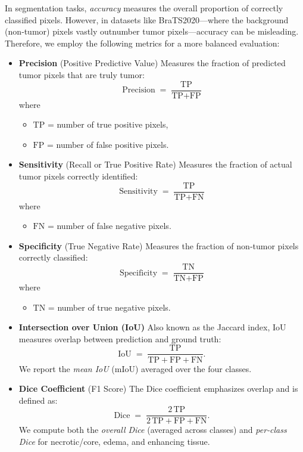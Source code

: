 In segmentation tasks, \emph{accuracy} measures the overall proportion of correctly classified pixels. However, in datasets like BraTS2020—where the background (non‐tumor) pixels vastly outnumber tumor pixels—accuracy can be misleading. Therefore, we employ the following metrics for a more balanced evaluation:

\begin{itemize}
  \item \textbf{Precision} (Positive Predictive Value)
        Measures the fraction of predicted tumor pixels that are truly tumor:
        \[
          \text{Precision} \;=\; \frac{\text{TP}}{\text{TP} + \text{FP}}
        \]
        where
        \begin{itemize}
          \item \(\text{TP}\) = number of true positive pixels,
          \item \(\text{FP}\) = number of false positive pixels.
        \end{itemize}

  \item \textbf{Sensitivity} (Recall or True Positive Rate)
        Measures the fraction of actual tumor pixels correctly identified:
        \[
          \text{Sensitivity} \;=\; \frac{\text{TP}}{\text{TP} + \text{FN}}
        \]
        where
        \begin{itemize}
          \item \(\text{FN}\) = number of false negative pixels.
        \end{itemize}

  \item \textbf{Specificity} (True Negative Rate)
        Measures the fraction of non‐tumor pixels correctly classified:
        \[
          \text{Specificity} \;=\; \frac{\text{TN}}{\text{TN} + \text{FP}}
        \]
        where
        \begin{itemize}
          \item \(\text{TN}\) = number of true negative pixels.
        \end{itemize}
  \item \textbf{Intersection over Union (IoU)}
        Also known as the Jaccard index, IoU measures overlap between prediction and ground truth:
        \[
          \text{IoU} \;=\; \frac{\text{TP}}{\text{TP} + \text{FP} + \text{FN}}.
        \]
        We report the \emph{mean IoU} (mIoU) averaged over the four classes.

  \item \textbf{Dice Coefficient} (F1 Score)
        The Dice coefficient emphasizes overlap and is defined as:
        \[
          \text{Dice} \;=\; \frac{2\,\text{TP}}{2\,\text{TP} + \text{FP} + \text{FN}}.
        \]
        We compute both the \emph{overall Dice} (averaged across classes) and \emph{per‐class Dice} for necrotic/core, edema, and enhancing tissue.
\end{itemize}

